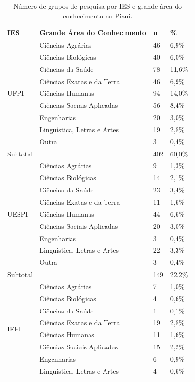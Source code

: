 \documentclass[portuguese]{textolivre}
\begin{document}
\begin{table}[htbp]
\centering
\begin{threeparttable}
\caption{Número de grupos de pesquisa por IES e grande área do conhecimento no Piauí.}
\label{tbl2}
\begin{tabular}{llll}
\toprule
IES & Grande Área do Conhecimento & n & \% \\ 
\midrule
\multirow{9}{*}{UFPI} & Ciências Agrárias & 46 & 6,9\% \\
 & Ciências Biológicas & 40 & 6,0\% \\
 & Ciências da Saúde & 78 & 11,6\% \\
 & Ciências Exatas e da Terra & 46 & 6,9\% \\
 & Ciências Humanas & 94 & 14,0\% \\
 & Ciências Sociais Aplicadas & 56 & 8,4\% \\
 & Engenharias & 20 & 3,0\% \\
 & Linguística, Letras e Artes & 19 & 2,8\% \\
 & Outra & 3 & 0,4\% \\
\midrule
Subtotal & & 402 & 60,0\% \\
\midrule
\multirow{9}{*}{UESPI} & Ciências Agrárias & 9 & 1,3\% \\
 & Ciências Biológicas & 14 & 2,1\% \\
 & Ciências da Saúde & 23 & 3,4\% \\
 & Ciências Exatas e da Terra & 11 & 1,6\% \\
 & Ciências Humanas & 44 & 6,6\% \\
 & Ciências Sociais Aplicadas & 20 & 3,0\% \\
 & Engenharias & 3 & 0,4\% \\
 & Linguística, Letras e Artes & 22 & 3,3\% \\
 & Outra & 3 & 0,4\% \\
\midrule
Subtotal & & 149 & 22,2\% \\
\midrule
\multirow{9}{*}{IFPI} & Ciências Agrárias & 7 & 1,0\% \\
 & Ciências Biológicas & 4 & 0,6\% \\
 & Ciências da Saúde & 1 & 0,1\% \\
 & Ciências Exatas e da Terra & 19 & 2,8\% \\
 & Ciências Humanas & 11 & 1,6\% \\
 & Ciências Sociais Aplicadas & 15 & 2,2\% \\
 & Engenharias & 6 & 0,9\% \\
 & Linguística, Letras e Artes & 4 & 0,6\% \\

\end{tabular}
\end{threeparttable}
\end{table}
\end{document}
